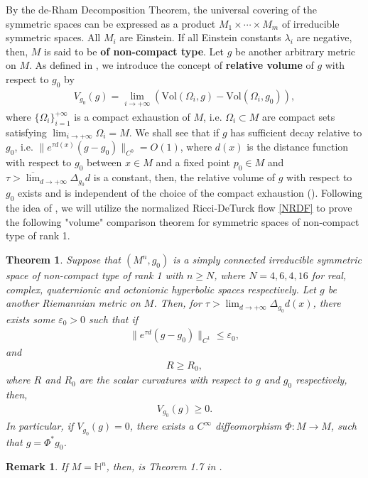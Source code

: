 \documentclass[12pt]{amsart}
\newtheorem{theorem}{Theorem}[section]
\newtheorem{remark}{Remark}[section]
\begin{document}
By the de-Rham Decomposition Theorem, the universal covering of the symmetric spaces can be expressed as a product $M_1 \times \cdots \times M_m$ of irreducible symmetric spaces. All $M_i$ are Einstein. If all Einstein constants $\lambda_i$ are negative, then, $M$ is said to be \textbf{of non-compact type}. Let $g$ be another arbitrary metric on $M$. As defined in \cite{HJS2016}, we introduce the concept of \textbf{relative volume} of $g$ with respect to $g_0$ by 
\begin{align}\label{definition of relative volume}
    V_{g_0}(g) = \lim_{i\rightarrow +\infty} \left(\mathrm{Vol}(\Omega_i, g) - \mathrm{Vol}(\Omega_i, g_0) \right), 
\end{align}
 where $\{\Omega_i\}_{i = 1}^{+\infty}$ is a compact exhaustion of $M$, i.e. $\Omega_i \subset M$ are compact sets satisfying $\lim_{i \rightarrow +\infty} \Omega_i = M$. We shall see that if $g$ has sufficient decay relative to $g_0$, i.e. $\|e^{\tau d(x)}(g - g_0)\|_{C^0} = O(1)$, where $d(x)$ is the distance function with respect to $g_0$ between $x\in M$ and a fixed point $p_0 \in M$ and $\tau > \overline{\lim}_{d \rightarrow +\infty} \Delta_{g_0} d$ is a constant, then, the relative volume of $g$ with respect to $g_0$ exists and is independent of the choice of the compact exhaustion (). Following the idea of \cite{HJS2016}, we will utilize the normalized Ricci-DeTurck flow \eqref{NRDF} to prove the following "volume" comparison theorem for symmetric spaces of non-compact type of rank 1. 
\begin{theorem}\label{main theorem}
    Suppose that $(M^n, g_0)$ is a simply connected irreducible symmetric space of non-compact type of rank 1 with $n \geq N$, where $N = 4, 6, 4, 16$ for real, complex, quaternionic and octonionic hyperbolic spaces respectively. Let $g$ be another Riemannian metric on $M$. Then, for $\tau > \lim_{d\rightarrow+\infty}\Delta_{g_0} d(x)$, there exists some $\varepsilon_0 > 0$ such that if 
    \begin{align*}
        \|e^{\tau d}(g - g_0)\|_{C^{1}} \leq \varepsilon_0,
    \end{align*}
    and 
    \begin{align*}
        R \geq R_0, 
    \end{align*}
    where $R$ and $R_0$ are the scalar curvatures with respect to $g$ and $g_0$ respectively, then, 
    \begin{align*}
        V_{g_0}(g) \geq 0. 
    \end{align*}
    In particular, if $V_{g_0}(g) = 0$, there exists a $C^{\infty}$ diffeomorphism $\Phi: M \rightarrow M$, such that $g = \Phi^{*}g_0$. 
\end{theorem}
\begin{remark}
    If $M = \mathbb{H}^n$, then,  is Theorem 1.7 in \cite{HJS2016}.
\end{remark}
\end{document}
